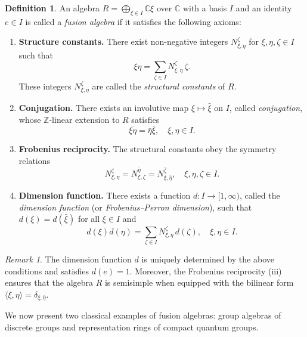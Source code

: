 \documentclass[12pt, reqno]{amsart}
\theoremstyle{definition}
\newtheorem{definition}[theorem]{Definition}
\theoremstyle{remark}
\newtheorem{remark}[theorem]{Remark}
\numberwithin{equation}{section}
\begin{document}
\begin{definition}\label{def:fusion_algebra}
An algebra $R = \bigoplus_{\xi \in I} \mathbb{C}\xi$ over $\mathbb{C}$ with a 
basis $I$ and an identity $e \in I$ is called a \emph{fusion algebra} if it 
satisfies the following axioms:

\begin{enumerate}
    \item[(i)] \textbf{Structure constants.} There exist non-negative integers 
    $N_{\xi,\eta}^{\zeta}$ for $\xi, \eta, \zeta \in I$ such that
    \[
    \xi\eta = \sum_{\zeta \in I} N_{\xi,\eta}^{\zeta}\,\zeta.
    \]
    These integers $N_{\xi,\eta}^{\zeta}$ are called the 
    \emph{structural constants} of $R$.
    
    \item[(ii)] \textbf{Conjugation.} There exists an involutive map 
    $\xi \mapsto \bar{\xi}$ on $I$, called \emph{conjugation}, whose 
    $\mathbb{Z}$-linear extension to $R$ satisfies
    \[
    \overline{\xi\eta} = \bar{\eta}\bar{\xi}, \quad \xi, \eta \in I.
    \]
    
    \item[(iii)] \textbf{Frobenius reciprocity.} The structural constants obey 
    the symmetry relations
    \[
    N_{\xi,\eta}^{\zeta} = N_{\xi,\zeta}^{\bar{\eta}} 
    = N_{\xi,\bar{\eta}}^{\bar{\zeta}}, \quad \xi, \eta, \zeta \in I.
    \]
    
    \item[(iv)] \textbf{Dimension function.} There exists a function 
    $d: I \to [1,\infty)$, called the \emph{dimension function} (or 
    \emph{Frobenius--Perron dimension}), such that 
    $d(\xi) = d(\bar{\xi})$ for all $\xi \in I$ and
    \[
    d(\xi)d(\eta) = \sum_{\zeta \in I} N_{\xi,\eta}^{\zeta}\,d(\zeta), 
    \quad \xi, \eta \in I.
    \]
\end{enumerate}
\end{definition}

\begin{remark}
The dimension function $d$ is uniquely determined by the above conditions 
and satisfies $d(e) = 1$. Moreover, the Frobenius reciprocity (iii) ensures 
that the algebra $R$ is semisimple when equipped with the bilinear form 
$\langle \xi, \eta \rangle = \delta_{\xi, \bar{\eta}}$.
\end{remark}

We now present two classical examples of fusion algebras: group algebras of 
discrete groups and representation rings of compact quantum groups.
\end{document}
